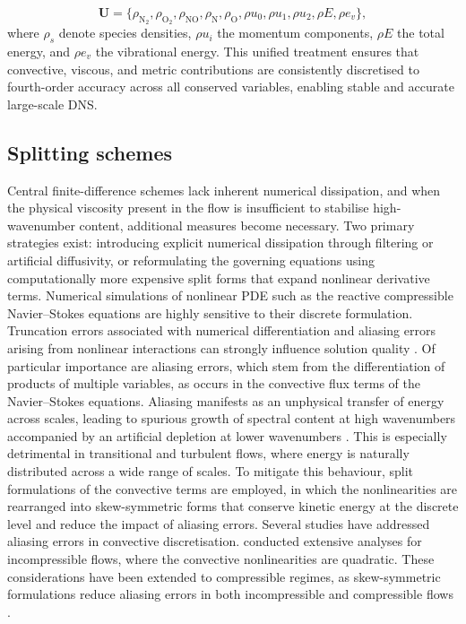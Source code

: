 \begin{equation}
    \mathbf{U} = \{\rho_{\text{N}_2}, \rho_{\text{O}_2}, \rho_{\text{NO}}, \rho_{\text{N}}, \rho_{\text{O}}, \rho u_0, \rho u_1, \rho u_2, \rho E, \rho e_v\},
\end{equation}
where $\rho_s$ denote species densities, $\rho u_i$ the momentum components, $\rho E$ the total energy, and $\rho e_v$ the vibrational energy. This unified treatment ensures that convective, viscous, and metric contributions are consistently discretised to fourth-order accuracy across all conserved variables, enabling stable and accurate large-scale \gls{DNS}.


\subsection{Splitting schemes}

Central finite-difference schemes lack inherent numerical dissipation, and when the physical viscosity present in the flow is insufficient to stabilise high-wavenumber content, additional measures become necessary. Two primary strategies exist: introducing explicit numerical dissipation through filtering or artificial diffusivity, or reformulating the governing equations using computationally more expensive split forms that expand nonlinear derivative terms. Numerical simulations of nonlinear PDE such as the reactive compressible Navier--Stokes equations are highly sensitive to their discrete formulation. Truncation errors associated with numerical differentiation and aliasing errors arising from nonlinear interactions can strongly influence solution quality \citep{Boyd2001}. Of particular importance are aliasing errors, which stem from the differentiation of products of multiple variables, as occurs in the convective flux terms of the Navier--Stokes equations. Aliasing manifests as an unphysical transfer of energy across scales, leading to spurious growth of spectral content at high wavenumbers accompanied by an artificial depletion at lower wavenumbers \citep{KennedyGruber2008}. This is especially detrimental in transitional and turbulent flows, where energy is naturally distributed across a wide range of scales. To mitigate this behaviour, split formulations of the convective terms are employed, in which the nonlinearities are rearranged into skew-symmetric forms that conserve kinetic energy at the discrete level and reduce the impact of aliasing errors. Several studies have addressed aliasing errors in convective discretisation.\cite{Zang1991} conducted extensive analyses for incompressible flows, where the convective nonlinearities are quadratic. These considerations have been extended to compressible regimes, as skew-symmetric formulations reduce aliasing errors in both incompressible and compressible flows \citep{Boyd2001}.

